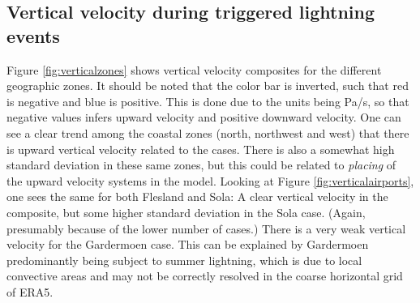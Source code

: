 \subsection{Vertical velocity during triggered lightning events}\label{sec:verticalvelocity}

Figure \ref{fig:verticalzones} shows vertical velocity composites for the different geographic zones. It should be noted that the color bar is inverted, such that red is negative and blue is positive. This is done due to the units being Pa/s, so that negative values infers upward velocity and positive downward velocity. One can see a clear trend among the coastal zones (north, northwest and west) that there is upward vertical velocity related to the cases. There is also a somewhat high standard deviation in these same zones, but this could be related to \textit{placing} of the upward velocity systems in the model. Looking at Figure \ref{fig:verticalairports}, one sees the same for both Flesland and Sola: A clear vertical velocity in the composite, but some higher standard deviation in the Sola case. (Again, presumably because of the lower number of cases.) There is a very weak vertical velocity for the Gardermoen case. This can be explained by Gardermoen predominantly being subject to summer lightning, which is due to local convective areas and may not be correctly resolved in the coarse horizontal grid of ERA5. 

